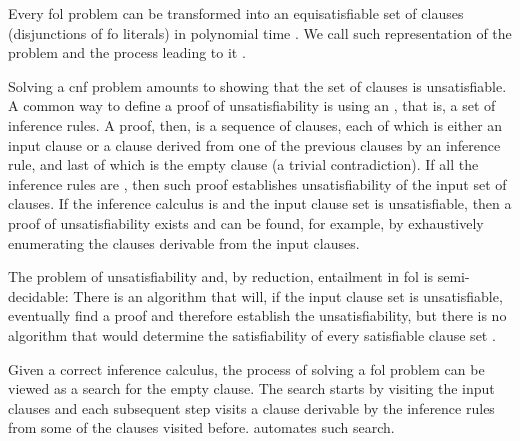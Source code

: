 Every \gls{fol} problem can be transformed into an equisatisfiable set of clauses (disjunctions of \gls{fo} literals) in polynomial time \cite{}.
We call such representation of the problem 
and the process leading to it .

Solving a \gls{cnf} problem amounts to showing that the set of clauses is unsatisfiable.
A common way to define a proof of unsatisfiability is using an ,
that is, a set of inference rules.
A proof, then, is a sequence of clauses,
each of which is either an input clause or a clause derived from one of the previous clauses by an inference rule, and
last of which is the empty clause (a trivial contradiction).
If all the inference rules are , then such proof establishes unsatisfiability of the input set of clauses.
If the inference calculus is  and the input clause set is unsatisfiable,
then a proof of unsatisfiability exists and can be found, for example, by exhaustively enumerating the clauses derivable from the input clauses.


The problem of unsatisfiability and, by reduction, entailment in \gls{fol} is semi-decidable:
There is an algorithm that will, if the input clause set is unsatisfiable, eventually find a proof and therefore establish the unsatisfiability,
but there is no algorithm that would determine the satisfiability of every satisfiable clause set \cite{}.


Given a correct inference calculus, the process of solving a \gls{fol} problem can be viewed as a search for the empty clause.
The search starts by visiting the input clauses and
each subsequent step visits a clause derivable by the inference rules from some of the clauses visited before.
 automates such search.

